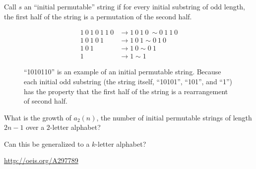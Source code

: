 \documentclass{article}
\begin{document}
  Call $s$ an ``initial permutable'' string if for every initial substring of
  odd length, the first half of the string is a permutation of the second half.
\begin{figure}[!h]
  \centering
  \begin{align*}
    1\ 0\ 1\ 0\ 1\ 1\ 0 &\rightarrow 1\ 0\ 1\ 0\ \sim 0\ 1\ 1\ 0\\
    1\ 0\ 1\ 0\ 1 &\rightarrow 1\ 0\ 1 \sim 0\ 1\ 0\\
    1\ 0\ 1 &\rightarrow 1\ 0 \sim 0\ 1\\
    1 &\rightarrow 1 \sim 1
  \end{align*}
  \caption{
    ``1010110'' is an example of an initial permutable string. Because each
    initial odd substring (the string itself, ``10101'', ``101'', and ``1'')
    has the property that the first half of the string is a rearrangement of
    second half.
  }
\end{figure}

\begin{question}
  What is the growth of $a_2(n)$, the number of initial permutable strings of
  length $2n - 1$ over a $2$-letter alphabet?
\end{question}
\begin{related}
  \item Can this be generalized to a $k$-letter alphabet?
\end{related}
\begin{references}
  \item \url{http://oeis.org/A297789}
\end{references}
\end{document}
